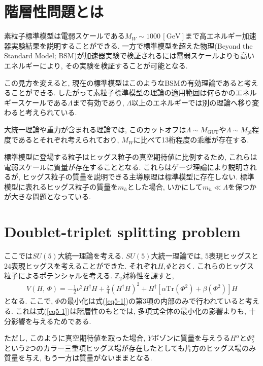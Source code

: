 \documentclass[titlepage]{jsbook}
\theoremstyle{plain}
\theoremstyle{definition}
\begin{document}
\section{階層性問題とは}
素粒子標準模型は電弱スケールである$M_W\sim1000\,[\mathrm{GeV}]$まで高エネルギー加速器実験結果を説明することができる.
一方で標準模型を超えた物理(Beyond the Standard Model; BSM)が加速器実験で検証されるには電弱スケールよりも高いエネルギーにより, その実験を検証することが可能となる.

この見方を変えると, 現在の標準模型はこのようなBSMの有効理論であると考えることができる.
したがって素粒子標準模型の理論の適用範囲は何らかのエネルギースケールである$\Lambda$まで有効であり, $\Lambda$以上のエネルギーでは別の理論へ移り変わると考えられている.

大統一理論や重力が含まれる理論では, このカットオフは$\Lambda\sim M_{\mathrm{GUT}}$や$\Lambda\sim M_{\mathrm{pl}}$程度であるとそれぞれ考えられており, $M_W$に比べて13桁程度の乖離が存在する.

標準模型に登場する粒子はヒッグス粒子の真空期待値に比例するため, これらは電弱スケールに質量が存在することとなる.
これらはゲージ理論により説明されるが, ヒッグス粒子の質量を説明できる主導原理は標準模型に存在しない.
標準模型に表れるヒッグス粒子の質量を$m_h$とした場合, いかにして$m_h \ll \Lambda$を保つかが大きな問題となっている.

\section{Doublet-triplet splitting problem}
ここでは$SU(5)$大統一理論を考える.
$SU(5)$大統一理論では, 5表現ヒッグスと24表現ヒッグスを考えることができた.
それぞれ$H$,\,$\Phi$とおく.
これらのヒッグス粒子によるポテンシャルを考える.
$\mathbb{Z}_2$対称性を課すと,
\begin{align}
  V(H,\,\Phi) = -\frac{1}{2}\nu^2 H^\dagger H + \frac{\lambda}{4}(H^\dagger H)^2 + H^\dagger[\alpha \mathrm{Tr}(\Phi^2)+\beta(\Phi^2)]H \label{eq5-1} 
\end{align}
となる.
ここで, $\Phi$の最小化は式(\ref{eq5-1})の第3項の内部のみで行われていると考える.
これは式(\ref{eq5-1})は階層性のもとでは, 多項式全体の最小化の影響よりも, 十分影響を与えるためである.

ただし, このように真空期待値を取った場合, $Y$ボゾンに質量を与えうる$H^\alpha$と$\Phi^\alpha_5$という2つのカラー三重項ヒッグス場が存在したとしても片方のヒッグス場のみ質量を与え, もう一方は質量がないままとなる.
\end{document}
